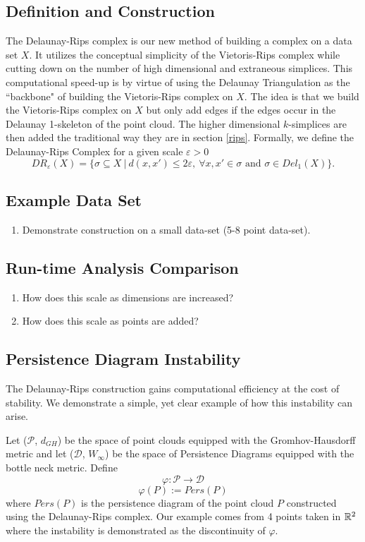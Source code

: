 \documentclass[letterpaper,titlepage]{article}
\begin{document}
\subsection{Definition and Construction} \label{del-rips:def}
The Delaunay-Rips complex is our new method of building a complex on a data set $X$. It utilizes the conceptual simplicity of the Vietoris-Rips complex while cutting down on the number of high dimensional and extraneous simplices. This computational speed-up is by virtue of using the Delaunay Triangulation as the ``backbone" of building the Vietoris-Rips complex on $X$. The idea is that we build the Vietoris-Rips complex on $X$ but only add edges if the edges occur in the Delaunay 1-skeleton of the point cloud. The higher dimensional $k$-simplices are then added the traditional way they are in section \ref{rips}. Formally, we define the Delaunay-Rips Complex for a given scale $\varepsilon>0$
$$DR_{\varepsilon}(X) = \{\sigma \subseteq X\ |\ d(x,x') \leq 2\varepsilon,\ \forall x,x' \in \sigma \text{ and } \sigma \in Del_1(X) \}.$$


\subsection{Example Data Set}
\begin{enumerate}
    \item Demonstrate construction on a small data-set (5-8 point data-set).
\end{enumerate}

\subsection{Run-time Analysis Comparison}
\begin{enumerate}
    \item How does this scale as dimensions are increased?
    \item How does this scale as points are added?
\end{enumerate}

\subsection{Persistence Diagram Instability}
The Delaunay-Rips construction gains computational efficiency at the cost of stability. We demonstrate a simple, yet clear example of how this instability can arise.

Let ($\mathcal{P}$, $d_{GH}$) be the space of point clouds equipped with the Gromhov-Hausdorff metric and let ($\mathcal{D}$, $W_\infty$) be the space of Persistence Diagrams equipped with the bottle neck metric. Define
$$\varphi: \mathcal{P} \to \mathcal{D}$$
$$\varphi(P):= Pers(P)$$
where $Pers(P)$ is the persistence diagram of the point cloud $P$ constructed using the Delaunay-Rips complex. Our example comes from 4 points taken in $\mathbb{R}^2$ where the instability is demonstrated as the discontinuity of $\varphi$.
\end{document}
